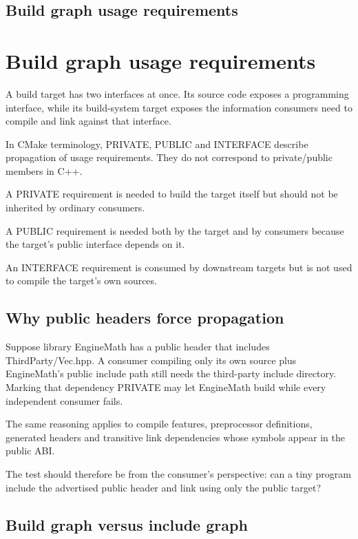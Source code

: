 \hypertarget{appendix-3327b8977adf}{}
\section*{Build graph usage requirements}
\chapter{Build graph usage requirements}\label{appendix-3327b8977adf-build-graph-usage-requirements}

A build target has two interfaces at once. Its source code exposes a programming interface, while its build-system target exposes the information consumers need to compile and link against that interface.

In CMake terminology, PRIVATE, PUBLIC and INTERFACE describe propagation of usage requirements. They do not correspond to private/public members in C++.

A PRIVATE requirement is needed to build the target itself but should not be inherited by ordinary consumers.

A PUBLIC requirement is needed both by the target and by consumers because the target's public interface depends on it.

An INTERFACE requirement is consumed by downstream targets but is not used to compile the target's own sources.

\section{Why public headers force propagation}\label{appendix-3327b8977adf-why-public-headers-force-propagation}

Suppose library EngineMath has a public header that includes ThirdParty/Vec.hpp. A consumer compiling only its own source plus EngineMath's public include path still needs the third-party include directory. Marking that dependency PRIVATE may let EngineMath build while every independent consumer fails.

The same reasoning applies to compile features, preprocessor definitions, generated headers and transitive link dependencies whose symbols appear in the public ABI.

The test should therefore be from the consumer's perspective: can a tiny program include the advertised public header and link using only the public target?

\section{Build graph versus include graph}\label{appendix-3327b8977adf-build-graph-versus-include-graph}

